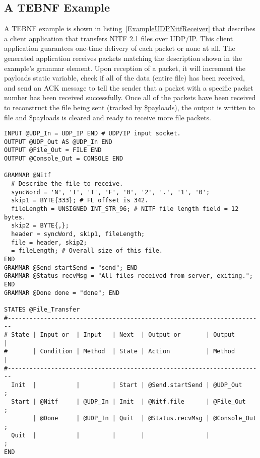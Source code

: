 \subsection{A TEBNF Example}
A TEBNF example is shown in listing~\ref{ExampleUDPNitfReceiver} that describes a client application that transfers NITF 2.1 files over UDP/IP.  This client application guarantees one-time delivery of each packet or none at all.  The generated application receives packets matching the description shown in the example’s grammar element.  Upon reception of a packet, it will increment the payloads static variable, check if all of the data (entire file) has been received, and send an ACK message to tell the sender that a packet with a specific packet number has been received successfully.  Once all of the packets have been received to reconstruct the file being sent (tracked by \$payloads), the output is written to file and \$payloads is cleared and ready to receive more file packets.
\begin{lstlisting}[basicstyle=\small,caption={TEBNF grammar describing a UDP NITF 2.1 file transfer client.},label=ExampleUDPNitfReceiver]
INPUT @UDP_In = UDP_IP END # UDP/IP input socket.
OUTPUT @UDP_Out AS @UDP_In END
OUTPUT @File_Out = FILE END
OUTPUT @Console_Out = CONSOLE END

GRAMMAR @Nitf
  # Describe the file to receive.
  syncWord = 'N', 'I', 'T', 'F', '0', '2', '.', '1', '0';
  skip1 = BYTE{333}; # FL offset is 342.
  fileLength = UNSIGNED INT_STR_96; # NITF file length field = 12 bytes.
  skip2 = BYTE{,};
  header = syncWord, skip1, fileLength;
  file = header, skip2;
  = fileLength; # Overall size of this file.
END
GRAMMAR @Send startSend = "send"; END
GRAMMAR @Status recvMsg = "All files received from server, exiting."; END
GRAMMAR @Done done = "done"; END

STATES @File_Transfer
#-----------------------------------------------------------------------
# State | Input or  | Input   | Next  | Output or       | Output       |
#       | Condition | Method  | State | Action          | Method       |
#-----------------------------------------------------------------------
  Init  |           |         | Start | @Send.startSend | @UDP_Out     ;
  Start | @Nitf     | @UDP_In | Init  | @Nitf.file      | @File_Out    ;
        | @Done     | @UDP_In | Quit  | @Status.recvMsg | @Console_Out ;
  Quit  |           |         |       |                 |              ;
END
\end{lstlisting}


\label{chap:TEBNFTuringCompletenessProof}

